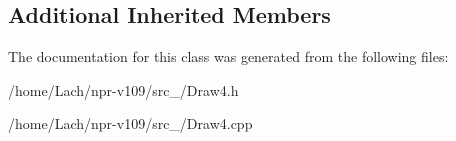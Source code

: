 \subsection*{Additional Inherited Members}


The documentation for this class was generated from the following files\+:\begin{DoxyCompactItemize}
\item 
/home/\+Lach/npr-\/v109/src\+\_/Draw4.\+h\item 
/home/\+Lach/npr-\/v109/src\+\_/Draw4.\+cpp\end{DoxyCompactItemize}
